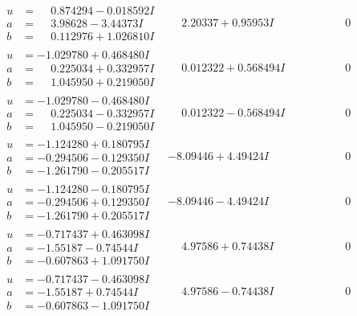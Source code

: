 \documentclass[1p]{elsarticle_modified}
\theoremstyle{definition}
\begin{document}
$$\begin{array}{c|c|c}
\begin{aligned}
u &= \phantom{-}0.874294 - 0.018592 I \\
a &= \phantom{-}3.98628 - 3.44373 I \\
b &= \phantom{-}0.112976 + 1.026810 I\end{aligned}
 & \phantom{-}2.20337 + 0.95953 I & \phantom{-0.000000 } 0 \\ \hline\begin{aligned}
u &= -1.029780 + 0.468480 I \\
a &= \phantom{-}0.225034 + 0.332957 I \\
b &= \phantom{-}1.045950 + 0.219050 I\end{aligned}
 & \phantom{-}0.012322 + 0.568494 I & \phantom{-0.000000 } 0 \\ \hline\begin{aligned}
u &= -1.029780 - 0.468480 I \\
a &= \phantom{-}0.225034 - 0.332957 I \\
b &= \phantom{-}1.045950 - 0.219050 I\end{aligned}
 & \phantom{-}0.012322 - 0.568494 I & \phantom{-0.000000 } 0 \\ \hline\begin{aligned}
u &= -1.124280 + 0.180795 I \\
a &= -0.294506 - 0.129350 I \\
b &= -1.261790 - 0.205517 I\end{aligned}
 & -8.09446 + 4.49424 I & \phantom{-0.000000 } 0 \\ \hline\begin{aligned}
u &= -1.124280 - 0.180795 I \\
a &= -0.294506 + 0.129350 I \\
b &= -1.261790 + 0.205517 I\end{aligned}
 & -8.09446 - 4.49424 I & \phantom{-0.000000 } 0 \\ \hline\begin{aligned}
u &= -0.717437 + 0.463098 I \\
a &= -1.55187 - 0.74544 I \\
b &= -0.607863 + 1.091750 I\end{aligned}
 & \phantom{-}4.97586 + 0.74438 I & \phantom{-0.000000 } 0 \\ \hline\begin{aligned}
u &= -0.717437 - 0.463098 I \\
a &= -1.55187 + 0.74544 I \\
b &= -0.607863 - 1.091750 I\end{aligned}
 & \phantom{-}4.97586 - 0.74438 I & \phantom{-0.000000 } 0 \\ \hline\begin{aligned}

\end{aligned}
\end{array}$$
\end{document}
